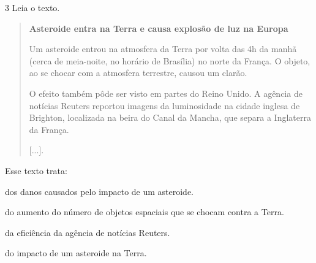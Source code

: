 
\num{3} Leia o texto.

\begin{quote}
\textbf{Asteroide entra na Terra e causa explosão de luz na Europa}

Um asteroide entrou na atmosfera da Terra por volta das 4h da manhã
(cerca de meia-noite, no horário de Brasília) no norte da França. O
objeto, ao se chocar com a atmosfera terrestre, causou um clarão.

O efeito também pôde ser visto em partes do Reino Unido. A agência de
notícias Reuters reportou imagens da luminosidade na cidade inglesa de
Brighton, localizada na beira do Canal da Mancha, que separa a
Inglaterra da França.

{[}...{]}.

\end{quote}

\pagebreak
Esse texto trata:

\begin{escolha}
\item dos danos causados pelo impacto de um asteroide.

\item do aumento do número de objetos espaciais que se chocam contra a Terra.

\item da eficiência da agência de notícias Reuters.

\item do impacto de um asteroide na Terra.
\end{escolha}



